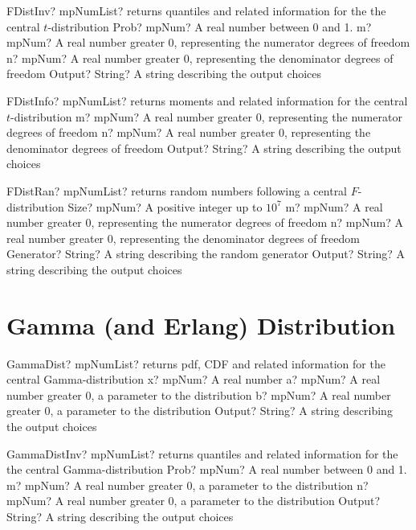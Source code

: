 \documentclass[12pt,a4paper,openany]{book}
\begin{document}
\begin{mpFunctionsExtract}
\mpFunctionThree
{FDistInv? mpNumList? returns quantiles and related information for the the central $t$-distribution}
{Prob? mpNum? A real number between 0 and 1.}
{m? mpNum? A real number greater 0, representing the numerator  degrees of freedom}
{n? mpNum? A real number greater 0, representing the denominator degrees of freedom}
{Output? String? A string describing the output choices}
\end{mpFunctionsExtract}

\begin{mpFunctionsExtract}
\mpFunctionThree
{FDistInfo? mpNumList? returns moments and related information for the central $t$-distribution}
{m? mpNum? A real number greater 0, representing the numerator  degrees of freedom}
{n? mpNum? A real number greater 0, representing the denominator degrees of freedom}
{Output? String? A string describing the output choices}
\end{mpFunctionsExtract}

\begin{mpFunctionsExtract}
\mpFunctionFive
{FDistRan? mpNumList? returns random numbers following a central $F$-distribution}
{Size? mpNum? A positive integer up to $10^7$}
{m? mpNum? A real number greater 0, representing the numerator  degrees of freedom}
{n? mpNum? A real number greater 0, representing the denominator degrees of freedom}
{Generator? String? A string describing the random generator}
{Output? String? A string describing the output choices}
\end{mpFunctionsExtract}

\section{Gamma (and Erlang) Distribution}

\begin{mpFunctionsExtract}
\mpFunctionFour
{GammaDist? mpNumList? returns pdf, CDF and related information for the central Gamma-distribution}
{x? mpNum? A real number}
{a? mpNum? A real number greater 0, a parameter to the distribution}
{b? mpNum? A real number greater 0, a parameter to the distribution}
{Output? String? A string describing the output choices}
\end{mpFunctionsExtract}

\begin{mpFunctionsExtract}
\mpFunctionThree
{GammaDistInv? mpNumList? returns quantiles and related information for the the central Gamma-distribution}
{Prob? mpNum? A real number between 0 and 1.}
{m? mpNum? A real number greater 0, a parameter to the distribution}
{n? mpNum? A real number greater 0, a parameter to the distribution}
{Output? String? A string describing the output choices}
\end{mpFunctionsExtract}
\end{document}
